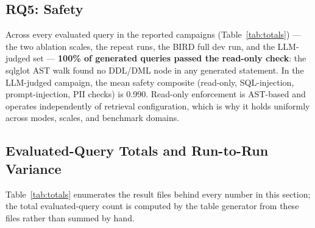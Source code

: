 \documentclass[conference]{IEEEtran}
\begin{document}
\subsection{RQ5: Safety}
\label{sec:rq_safety}

Across every evaluated query in the reported campaigns
(Table~\ref{tab:totals}) --- the two ablation scales, the repeat runs,
the BIRD full dev run, and the LLM-judged set --- \textbf{100\% of
generated queries passed the read-only check}: the sqlglot AST walk
found no DDL/DML node in any generated statement. In the LLM-judged campaign, the mean
safety composite (read-only, SQL-injection, prompt-injection, PII
checks) is 0.990. Read-only enforcement is AST-based and operates
independently of retrieval configuration, which is why it holds
uniformly across modes, scales, and benchmark domains.

\subsection{Evaluated-Query Totals and Run-to-Run Variance}
\label{sec:totals}

Table~\ref{tab:totals} enumerates the result files behind every number
in this section; the total evaluated-query count is computed by the
table generator from these files rather than summed by hand.

\begin{table}[!htb]
\caption{Evaluated Queries by Campaign (Generated from the Citable
Result Files)}
\label{tab:totals}
\centering
\resizebox{\columnwidth}{!}{}
\end{table}

\end{document}
